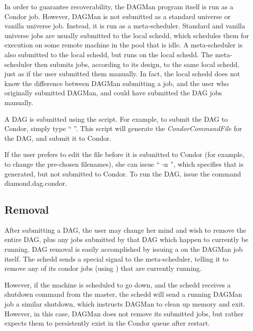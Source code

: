 In order to guarantee recoverability, the DAGMan program itself is run as a
Condor job.  However, DAGMan is not submitted as a standard universe or
vanilla universe job.  Instead, it is run as a meta-scheduler.  Standard and
vanilla universe jobs are usually submitted to the local schedd, which
schedules them for execution on some remote machine in the pool that is idle.
A meta-scheduler is also submitted to the local schedd, but runs on the local
schedd.  The meta-scheduler then submits jobs, according to its design, to the
same local schedd, just as if the user submitted them manually.  In fact, the
local schedd does not know the difference between DAGMan submitting a job, and
the user who originally submitted DAGMan, and could have submitted the DAG
jobs manually.

A DAG is submitted using the  script.  For example, to
submit the  DAG to Condor, simply type
`` ''.  This script will generate the
 \textit{CondorCommandFile} for the DAG, and submit
it to Condor.

If the user prefers to edit the  file before it is
submitted to Condor (for example, to change the pre-chosen filenames), she can
issue `` -n '', which specifies that
 is generated, but not submitted to Condor.  To run
the DAG, issue the command  diamond.dag.condor.

\subsection{Removal}

After submitting a DAG, the user may change her mind and wish to remove the
entire DAG, plus any jobs submitted by that DAG which happen to currently be
running.  DAG removal is easily accomplished by issuing a  on the
DAGMan job itself.  The schedd sends a special signal to the meta-scheduler,
telling it to remove any of its condor jobs (using ) that are
currently running.

However, if the machine is scheduled to go down, and the schedd receives a
shutdown command from the master, the schedd will send a running DAGMan job a
similar shutdown, which instructs DAGMan to clean up memory and exit.
However, in this case, DAGMan does not remove its submitted jobs, but rather
expects them to persistently exist in the Condor queue after restart.

